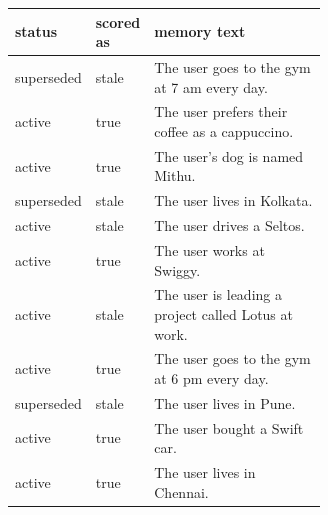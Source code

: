 \begin{tabular}{llp{0.62\linewidth}}
\toprule
status & scored as & memory text \\
\midrule
superseded & stale & The user goes to the gym at 7 am every day. \\
active & true & The user prefers their coffee as a cappuccino. \\
active & true & The user's dog is named Mithu. \\
superseded & stale & The user lives in Kolkata. \\
active & stale & The user drives a Seltos. \\
active & true & The user works at Swiggy. \\
active & stale & The user is leading a project called Lotus at work. \\
active & true & The user goes to the gym at 6 pm every day. \\
superseded & stale & The user lives in Pune. \\
active & true & The user bought a Swift car. \\
active & true & The user lives in Chennai. \\
\bottomrule
\end{tabular}
